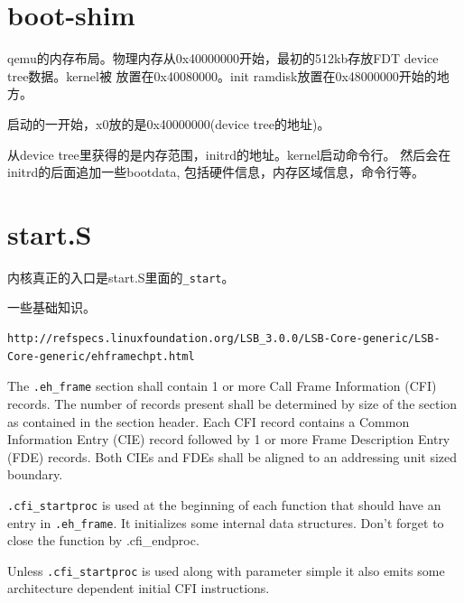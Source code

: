 \section{boot-shim}
qemu的内存布局。物理内存从0x40000000开始，最初的512kb存放FDT device tree数据。kernel被
放置在0x40080000。init ramdisk放置在0x48000000开始的地方。

启动的一开始，x0放的是0x40000000(device tree的地址)。

从device tree里获得的是内存范围，initrd的地址。kernel启动命令行。
然后会在initrd的后面追加一些bootdata, 包括硬件信息，内存区域信息，命令行等。

\section{start.S}

内核真正的入口是start.S里面的\verb!_start!。

一些基础知识。
\begin{verbatim}
http://refspecs.linuxfoundation.org/LSB_3.0.0/LSB-Core-generic/LSB-Core-generic/ehframechpt.html
\end{verbatim}
The \verb!.eh_frame! section shall contain 1 or more Call Frame Information (CFI)
records. The number of records present shall be determined by size of the 
section as contained in the section header. Each CFI record contains a Common 
Information Entry (CIE) record followed by 1 or more Frame Description Entry 
(FDE) records. Both CIEs and FDEs shall be aligned to an addressing unit 
sized boundary.

\verb!.cfi_startproc! is used at the beginning of each function that should have an 
entry in \verb!.eh_frame!. It initializes some internal data structures. Don’t forget 
to close the function by .cfi\_endproc.

Unless \verb!.cfi_startproc! is used along with parameter simple it also emits some 
architecture dependent initial CFI instructions. 

